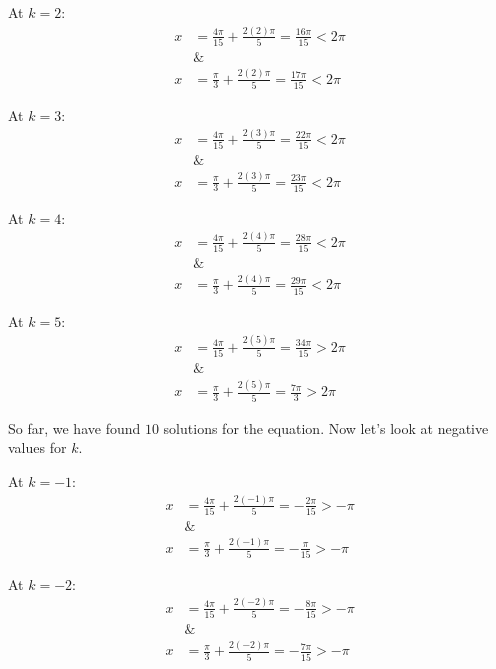 \documentclass[12pt]{article}
\theoremstyle{definition}
\begin{document}
At $k=2$:
\begin{align}
    x         & =\frac{4\pi}{15} + \frac{2(2)\pi}{5} = \frac{16\pi}{15} < 2\pi \\
    \nonumber & \&                                                             \\
    x         & =\frac{\pi}{3} + \frac{2(2)\pi}{5} = \frac{17\pi}{15} < 2\pi
\end{align}

At $k=3$:
\begin{align}
    x         & =\frac{4\pi}{15} + \frac{2(3)\pi}{5} = \frac{22\pi}{15} < 2\pi \\
    \nonumber & \&                                                             \\
    x         & =\frac{\pi}{3} + \frac{2(3)\pi}{5} = \frac{23\pi}{15} < 2\pi
\end{align}

At $k=4$:
\begin{align}
    x         & =\frac{4\pi}{15} + \frac{2(4)\pi}{5} = \frac{28\pi}{15} < 2\pi \\
    \nonumber & \&                                                             \\
    x         & =\frac{\pi}{3} + \frac{2(4)\pi}{5} = \frac{29\pi}{15} < 2\pi
\end{align}

At $k=5$:
\begin{align}
    x         & =\frac{4\pi}{15} + \frac{2(5)\pi}{5} = \frac{34\pi}{15} > 2\pi \\
    \nonumber & \&                                                             \\
    x         & =\frac{\pi}{3} + \frac{2(5)\pi}{5} = \frac{7\pi}{3} > 2\pi
\end{align}

So far, we have found $10$ solutions for the equation.
Now let's look at negative values for $k$.

At $k=-1$:
\begin{align}
    x         & =\frac{4\pi}{15} + \frac{2(-1)\pi}{5} = -\frac{2\pi}{15} > -\pi \\
    \nonumber & \&                                                              \\
    x         & =\frac{\pi}{3} + \frac{2(-1)\pi}{5} = -\frac{\pi}{15} > -\pi
\end{align}

At $k=-2$:
\begin{align}
    x         & =\frac{4\pi}{15} + \frac{2(-2)\pi}{5} = -\frac{8\pi}{15} > -\pi \\
    \nonumber & \&                                                              \\
    x         & =\frac{\pi}{3} + \frac{2(-2)\pi}{5} = -\frac{7\pi}{15} > -\pi
\end{align}
\end{document}
